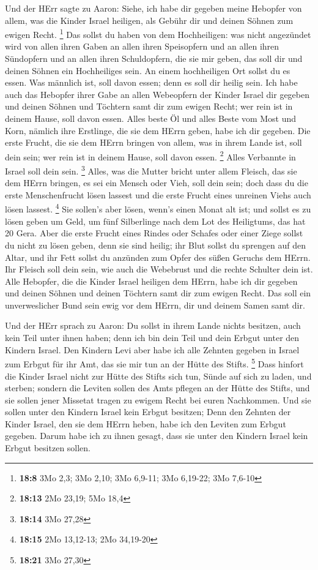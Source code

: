  Und der HErr sagte zu Aaron: Siehe, ich habe dir gegeben
meine Hebopfer von allem, was die Kinder Israel heiligen, als Gebühr dir
und deinen Söhnen zum ewigen Recht. \footnote{\textbf{18:8} 3Mo 2,3; 3Mo
  2,10; 3Mo 6,9-11; 3Mo 6,19-22; 3Mo 7,6-10}  Das sollst
du haben von dem Hochheiligen: was nicht angezündet wird von allen ihren
Gaben an allen ihren Speisopfern und an allen ihren Sündopfern und an
allen ihren Schuldopfern, die sie mir geben, das soll dir und deinen
Söhnen ein Hochheiliges sein.  An einem hochheiligen Ort
sollst du es essen. Was männlich ist, soll davon essen; denn es soll dir
heilig sein.  Ich habe auch das Hebopfer ihrer Gabe an
allen Webeopfern der Kinder Israel dir gegeben und deinen Söhnen und
Töchtern samt dir zum ewigen Recht; wer rein ist in deinem Hause, soll
davon essen.  Alles beste Öl und alles Beste vom Most und
Korn, nämlich ihre Erstlinge, die sie dem HErrn geben, habe ich dir
gegeben.  Die erste Frucht, die sie dem HErrn bringen von
allem, was in ihrem Lande ist, soll dein sein; wer rein ist in deinem
Hause, soll davon essen. \footnote{\textbf{18:13} 2Mo 23,19; 5Mo 18,4}
 Alles Verbannte in Israel soll dein sein. \footnote{\textbf{18:14}
  3Mo 27,28}  Alles, was die Mutter bricht unter allem
Fleisch, das sie dem HErrn bringen, es sei ein Mensch oder Vieh, soll
dein sein; doch dass du die erste Menschenfrucht lösen lassest und die
erste Frucht eines unreinen Viehs auch lösen lassest. \footnote{\textbf{18:15}
  2Mo 13,12-13; 2Mo 34,19-20}  Sie sollen's aber lösen,
wenn's einen Monat alt ist; und sollst es zu lösen geben um Geld, um
fünf Silberlinge nach dem Lot des Heiligtums, das hat 20 Gera.
 Aber die erste Frucht eines Rindes oder Schafes oder
einer Ziege sollst du nicht zu lösen geben, denn sie sind heilig; ihr
Blut sollst du sprengen auf den Altar, und ihr Fett sollst du anzünden
zum Opfer des süßen Geruchs dem HErrn.  Ihr Fleisch soll
dein sein, wie auch die Webebrust und die rechte Schulter dein ist.
 Alle Hebopfer, die die Kinder Israel heiligen dem HErrn,
habe ich dir gegeben und deinen Söhnen und deinen Töchtern samt dir zum
ewigen Recht. Das soll ein unverweslicher Bund sein ewig vor dem HErrn,
dir und deinem Samen samt dir.

 Und der HErr sprach zu Aaron: Du sollst in ihrem Lande
nichts besitzen, auch kein Teil unter ihnen haben; denn ich bin dein
Teil und dein Erbgut unter den Kindern Israel.  Den
Kindern Levi aber habe ich alle Zehnten gegeben in Israel zum Erbgut für
ihr Amt, das sie mir tun an der Hütte des Stifts. \footnote{\textbf{18:21}
  3Mo 27,30}  Dass hinfort die Kinder Israel nicht zur
Hütte des Stifts sich tun, Sünde auf sich zu laden, und sterben;
 sondern die Leviten sollen des Amts pflegen an der Hütte
des Stifts, und sie sollen jener Missetat tragen zu ewigem Recht bei
euren Nachkommen. Und sie sollen unter den Kindern Israel kein Erbgut
besitzen;  Denn den Zehnten der Kinder Israel, den sie
dem HErrn heben, habe ich den Leviten zum Erbgut gegeben. Darum habe ich
zu ihnen gesagt, dass sie unter den Kindern Israel kein Erbgut besitzen
sollen.

